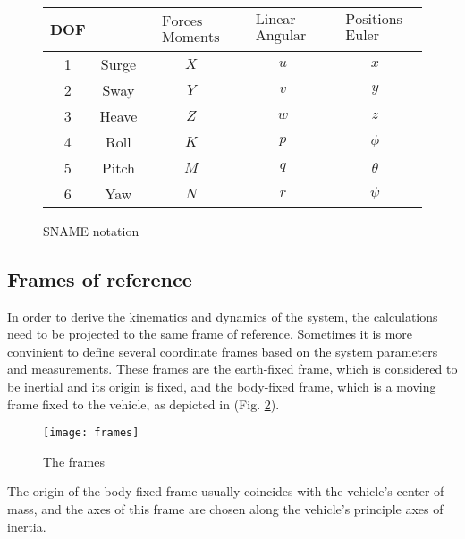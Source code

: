     \begin{figure}[H]
        \begin{tabular}{|c|c|c|c|c|}
            \hline DOF & & $\begin{array}{c}\text { Forces and } \\
            \text { Moments }\end{array}$ & $\begin{array}{c}\text { Linear and } \\
            \text { Angular velocity }\end{array}$ & $\begin{array}{c}\text { Positions and } \\
            \text { Euler Angles }\end{array}$ \\
            \hline
            1 & Surge & $X$ & $u$ & $x$ \\
            2 & Sway & $Y$ & $v$ & $y$ \\
            3 & Heave & $Z$ & $w$ & $z$ \\
            4 & Roll & $K$ & $p$ & $\phi$ \\
            5 & Pitch & $M$ & $q$ & $\theta$ \\
            6 & Yaw & $N$ & $r$ & $\psi$ \\
            \hline
        \end{tabular}
        \caption{SNAME notation}
        \label{table:sname}
    \end{figure}

\subsection{Frames of reference}

    In order to derive the kinematics and dynamics of the system, the calculations need to be projected to the same frame of reference.
    Sometimes it is more convinient to define several coordinate frames based on the system parameters and measurements.
    These frames are the earth-fixed frame, which is considered to be inertial and its origin is fixed, and the body-fixed frame, which is a moving frame fixed to the vehicle, as depicted in (Fig. \ref{image:frames}). 
    \begin{figure}[H]
        \centering\texttt{[image: frames]}
        \caption{The frames}
        \label{image:frames}
    \end{figure}

    The origin of the body-fixed frame usually coincides with the vehicle's center of mass,
     and the axes of this frame are chosen along the vehicle's principle axes of inertia.

